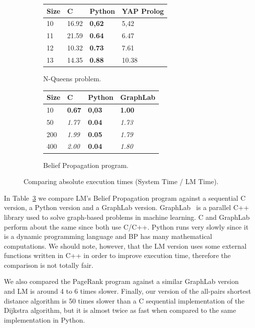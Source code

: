 \begin{figure}[h]
   \centering
   
   \begin{subfigure}[b]{0.45\textwidth}
      \resizebox{5cm}{!} {
      \begin{tabular}{ | l | l | l | l |}
       \hline

       Size & C & Python & YAP Prolog \\ \hline\hline
       10 & 16.92 & \textbf{0,62} & 5,42 \\
       11 & 21.59 & \textbf{0.64} & 6.47 \\
       12 & 10.32 & \textbf{0.73} & 7.61 \\
       13 & 14.35 & \textbf{0.88} & 10.38 \\
       \hline
       \end{tabular}}
       \caption{N-Queens problem.}
      \label{comp:nqueens}
   \end{subfigure}
   \begin{subfigure}[b]{0.45\textwidth}
      \resizebox{4.6cm}{!} {
      \begin{tabular}{ | l | l | l | l |}
       \hline

       Size & C & Python & GraphLab \\ \hline\hline
       10 & \textbf{0.67} & \textbf{0,03} & \textbf{1.00} \\
       50 & \textit{1.77} & \textbf{0.04} & \textit{1.73} \\
       200 & \textit{1.99} & \textbf{0.05} & \textit{1.79} \\
       400 & \textit{2.00} & \textbf{0.04} & \textit{1.80} \\
       \hline
       \end{tabular}}
       \caption{Belief Propagation program.}
       \label{comp:bp}
   \end{subfigure}
   \caption{Comparing absolute execution times (System Time / LM Time).}
\end{figure}

In Table~\ref{comp:bp} we compare LM's Belief Propagation program against a sequential C version, a Python version and a GraphLab version. GraphLab~\cite{GraphLab2010} is a parallel C++ library used to solve graph-based problems in machine learning. C and GraphLab
perform about the same since both use C/C++. Python runs very slowly since it is a dynamic programming language and BP has many
mathematical computations. We should note, however, that the LM version uses some external functions written in C++ in order
to improve execution time, therefore the comparison is not totally fair.

We also compared the PageRank program against a similar GraphLab version and LM is around 4 to 6 times slower.
Finally, our version of the all-pairs shortest distance algorithm is 50 times slower than a C sequential implementation of the Dijkstra algorithm, but it is almost twice as fast when compared to the same implementation in Python.